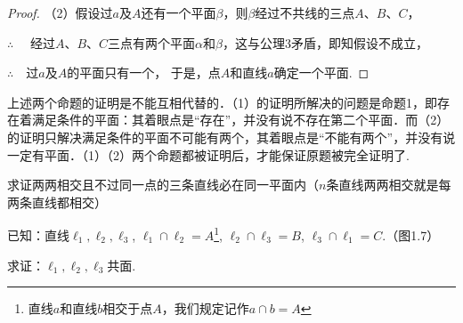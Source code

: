 \begin{proof}
    （2）假设过$a$及$A$还有一个平面$\beta$，则$\beta$经过不共线的三点$A$、$B$、$C$，

$\therefore\quad$    经过$A$、$B$、$C$三点有两个平面$\alpha$和$\beta$，这与公理3矛盾，即知假设不成立，

$\therefore\quad $过$a$及$A$的平面只有一个，
于是，点$A$和直线$a$确定一个平面.
\end{proof}

\begin{note}
    上述两个命题的证明是不能互相代替的．（1）的证明所解决的问题是命题1，即存在着满足条件的平面：其着眼点是“存在”，并没有说不存在第二个平面．而（2）的证明只解决满足条件的平面不可能有两个，其着眼点是“不能有两个”，并没有说一定有平面．（1）（2）两个命题都被证明后，才能保证原题被完全证明了.
\end{note}

\begin{example}
    求证两两相交且不过同一点的三条直线必在同一平面内（$n$条直线两两相交就是每两条直线都相交）

已知：直线$\ell_1,\ell_2,\ell_3$, $\ell_1\cap \ell_2=A$\footnote{直线$a$和直线$b$相交于点$A$，我们规定记作$a\cap b=A$}, $\ell_2\cap \ell_3=B$, $\ell_3\cap \ell_1=C$.（图1.7）

求证：$\ell_1,\ell_2,\ell_3$共面.
\end{example}

